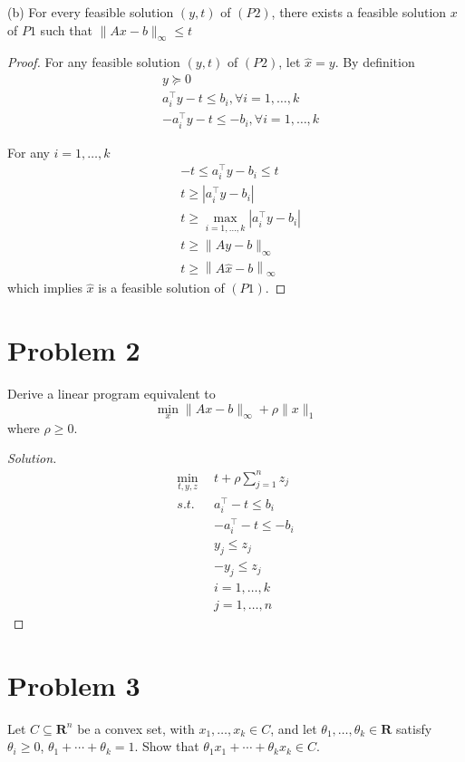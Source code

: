 \documentclass[11pt]{article}
\newenvironment{solution}
  {\renewcommand\qedsymbol{$\blacksquare$}\begin{proof}[Solution]}
  {\end{proof}}
\newcommand{\T}{^\top}
\begin{document}
(b) For every feasible solution $(y, t)$ of $(P 2)$, there exists a feasible solution $x$ of $P 1$ such that $\|A x-b\|_{\infty} \leq t$

\begin{proof}
    For any feasible solution $(y, t)$ of $(P 2)$, let $\hat x=y$. By definition
    \begin{align*}
    &y\succeq0\\
    &a_i^{\top} y-t \leq b_i,  \forall i=1, \dots, k\\
    &-a_i^{\top} y-t \leq-b_i,  \forall i=1, \dots, k
    \end{align*}

    For any $i=1, \dots, k$
    \begin{align*}
    &-t \leq a_i^{\top} y-b_i \leq t\\
    &t \geq \left|a_i^{\top} y-b_i\right|\\
    &t \geq \max _{i=1, \dots, k}\left|a_i^{\top} y-b_i\right| \\
    &t \geq \|A y-b\|_{\infty} \\
    &t \geq \left\|A \hat x-b\right\|_{\infty} 
    \end{align*}
    which implies $\hat x$ is a feasible solution of $(P1)$.
\end{proof}

\clearpage
\section*{Problem 2}

Derive a linear program equivalent to
$$
\min_x \|Ax-b\|_\infty + \rho\|x\|_1
$$
where $\rho\geq 0$.

\begin{solution}
    \begin{align*}
        \min_{t, y, z} ~~ &t + \rho \sum_{j=1}^{n} z_j\\
        s.t. ~~& a_i\T - t \leq b_i\\
        &-a_i\T - t \leq -b_i \\
        &y_j \leq z_j\\
        &-y_j \leq z_j\\
        &i = 1, \dots, k\\
        &j = 1, \dots, n
    \end{align*}
\end{solution}

\clearpage
\section*{Problem 3}
Let $C \subseteq \mathbf{R}^n$ be a convex set, with $x_1, \ldots, x_k \in C$, and let $\theta_1, \ldots, \theta_k \in \mathbf{R}$ satisfy $\theta_i \geq 0$, $\theta_1+\cdots+\theta_k=1$. Show that $\theta_1 x_1+\cdots+\theta_k x_k \in C$.
\end{document}
